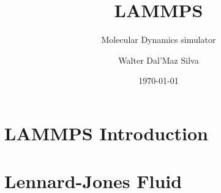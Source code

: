 \documentclass[aspectratio=169]{beamer}
\title{LAMMPS}
\subtitle{Molecular Dynamics simulator}
\author{Walter Dal'Maz Silva}
\date{\today}
\begin{document}
\maketitle

\section{LAMMPS Introduction}


\section{Lennard-Jones Fluid}

\end{document}
